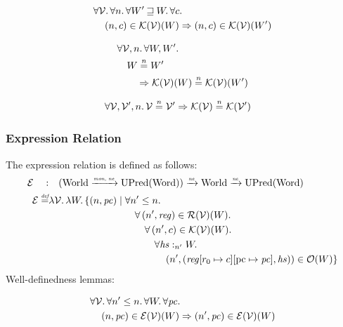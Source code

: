 \documentclass{article}
\newcommand{\update}[2]{[#1 \mapsto #2]}
\newcommand{\monnefun}{\xrightarrow{\textit{\tiny{mon, ne}}}}
\newcommand{\nefun}{\xrightarrow{\textit{\tiny{ne}}}}
\newcommand{\defeq}{\stackrel{\textit{\tiny{def}}}{=}}
\newcommand{\nequal}[1][n]{\stackrel{\tiny{#1}}{=}}
\newcommand{\var}[1]{\mathit{#1}}
\newcommand{\hs}{\var{hs}}
\newcommand{\pc}{\mathit{pc}}
\newcommand{\pcreg}{\mathrm{pc}}
\newcommand{\reg}{\var{reg}}
\newcommand{\heap}{\var{heap}}
\newcommand{\future}{\mathbin{\sqsupseteq}}
\newcommand{\heapSat}[3][\heap]{#1 :_{#2} #3}
\newcommand{\asmType}{\plaindom{AsmType}}
\newcommand{\plaindom}[1]{\mathrm{#1}}
\newcommand{\Words}{\plaindom{Word}}
\newcommand{\Worlds}{\plaindom{World}}
\newcommand{\UPred}[1]{\plaindom{UPred}(#1)}
\newcommand{\intr}[2]{\mathcal{#1}}
\newcommand{\valueintr}[1]{\intr{V}{#1}}
\newcommand{\exprintr}[1]{\intr{E}{#1}}
\newcommand{\contintr}[1]{\intr{K}{#1}}
\newcommand{\regintr}[1]{\intr{R}{#1}}
\newcommand{\stdvr}{\valueintr{\asmType}}
\newcommand{\stder}{\exprintr{\asmType}}
\newcommand{\stdrr}{\regintr{\asmType}}
\newcommand{\stdkr}{\contintr{\asmType}}
\newcommand{\observations}{\mathcal{O}}
\newcommand{\npair}[2][n]{\left(#1,#2 \right)}
\begin{document}
\begin{lemma}
\label{lem:stdkr-mono-worlds}
  \begin{align*}
    &\forall \stdvr \ldotp \forall n \ldotp \forall W' \future W \ldotp \forall c \ldotp\\
    &\quad \npair{c} \in \stdkr(\stdvr)(W) \Rightarrow \npair{c} \in \stdkr(\stdvr)(W')
  \end{align*}
\end{lemma}

\begin{lemma}
  \label{lem:stdkr-ne-worlds}
  \begin{align*}
    &\forall \stdvr, n \ldotp \forall W, W' \ldotp\\
    &\quad W \nequal W' \\
    &\qquad \Rightarrow \stdkr(\stdvr)(W) \nequal \stdkr(\stdvr)(W')
  \end{align*}
\end{lemma}

\begin{lemma}
\label{lem:stdkr-ne-vr}
\begin{align*}
  &\forall \stdvr, \stdvr', n \ldotp \stdvr \nequal \stdvr' \Rightarrow \stdkr(\stdvr) \nequal \stdkr(\stdvr')
\end{align*}
\end{lemma}


\subsubsection{Expression Relation}
\label{subsubsec:expression-relation}
The expression relation is defined as follows:
\begin{align*}
  \stder \quad : & \quad  (\Worlds \monnefun \UPred{\Words}) \nefun \Worlds \nefun \UPred{\Words} \\%
  \stder \defeq & \lambda \stdvr \ldotp \lambda W \ldotp \{ \npair{\pc} \mid 
  \begin{aligned}[t]
    & \forall n' \leq n \ldotp\\
    & \quad \forall \npair[n']{\reg} \in \stdrr(\stdvr)(W) \ldotp \\
    & \quad \quad \forall \npair[n']{c} \in \stdkr(\stdvr)(W) \ldotp \\
    & \quad \qquad  \forall \heapSat[\hs]{n'}{W} \ldotp \\
    & \quad \qquad \quad \npair[n']{(\reg\update{r_0}{c}\update{\pcreg}{\pc},\hs)} \in \observations(W) \}
  \end{aligned}
\end{align*}
Well-definedness lemmas:
\begin{lemma}
\label{lem:stder-dc}
  \begin{align*}
    & \forall \stdvr \ldotp \forall n' \leq n \ldotp \forall W \ldotp \forall \pc \ldotp\\
    & \quad \npair{\pc} \in \stder(\stdvr)(W) \Rightarrow \npair[n']{\pc} \in \stder(\stdvr)(W) 
 \end{align*}
\end{lemma}
\end{document}
